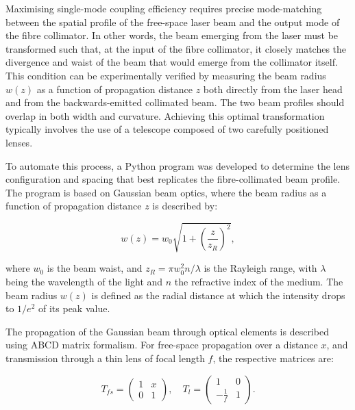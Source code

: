 Maximising single-mode coupling efficiency requires precise mode-matching between the spatial profile of the free-space laser beam and the output mode of the fibre collimator. In other words, the beam emerging from the laser must be transformed such that, at the input of the fibre collimator, it closely matches the divergence and waist of the beam that would emerge from the collimator itself. This condition can be experimentally verified by measuring the beam radius $w(z)$ as a function of propagation distance $z$ both directly from the laser head and from the backwards-emitted collimated beam. The two beam profiles should overlap in both width and curvature. Achieving this optimal transformation typically involves the use of a telescope composed of two carefully positioned lenses.

To automate this process, a Python program was developed to determine the lens configuration and spacing that best replicates the fibre-collimated beam profile. The program is based on Gaussian beam optics, where the beam radius as a function of propagation distance $z$ is described by:

\begin{equation}
    w(z) = w_0 \sqrt{1 + \left( \frac{z}{z_R} \right)^2},
    \label{eqn:beam-radius}
\end{equation}

where $w_0$ is the beam waist, and $z_R = \pi w_0^2 n / \lambda$ is the Rayleigh range, with $\lambda$ being the wavelength of the light and $n$ the refractive index of the medium. The beam radius $w(z)$ is defined as the radial distance at which the intensity drops to $1/e^2$ of its peak value.

The propagation of the Gaussian beam through optical elements is described using ABCD matrix formalism. For free-space propagation over a distance $x$, and transmission through a thin lens of focal length $f$, the respective matrices are:

\begin{equation}
    T_{fs} =
    \begin{pmatrix}
        1 & x \\
        0 & 1 
    \end{pmatrix}, \quad
    T_{l} =
    \begin{pmatrix}
        1 & 0 \\
        -\frac{1}{f} & 1 
    \end{pmatrix}.
    \label{eqn:beam-tm}
\end{equation}

